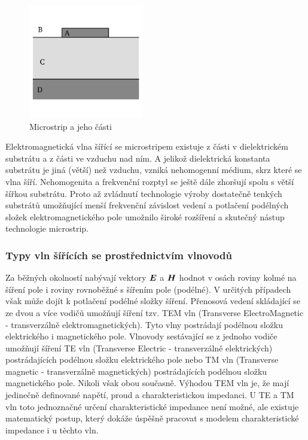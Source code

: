 \documentclass[12pt,a4paper,oneside]{article}
\numberwithin{equation}{section} %
\numberwithin{figure}{section} %
\numberwithin{table}{section} %
\renewcommand{\vec}[1]{\mbox{\boldmath$#1$}} %
\begin{document}
\begin{figure}[h] 
\begin{center}
\includegraphics[width=5cm]{microstrip.png}
\caption{Microstrip a jeho části}
\label{microstrip}
\end{center}
\end{figure}

Elektromagnetická vlna šířící se microstripem existuje z části v dielektrickém substrátu a z části ve vzduchu nad ním. A jelikož dielektrická konstanta substrátu je jiná (větší) než vzduchu, vzniká nehomogenní médium, skrz které se vlna šíří. Nehomogenita a frekvenční rozptyl se ještě dále zhoršují spolu s větší šířkou substrátu. Proto až zvládnutí technologie výroby dostatečně tenkých substrátů umožňující menší frekvenční závislost vedení a potlačení podélných složek elektromagnetického pole umožnilo široké rozšíření a skutečný nástup technologie microstrip. \cite{Microstrip}

\subsubsection{Typy vln šířících se prostřednictvím vlnovodů}
Za běžných okolností nabývají vektory $\vec{E}$ a $\vec{H}$ hodnot v osách roviny kolmé na šíření pole i roviny rovnoběžné s šířením pole (podélné). V určitých případech však může dojít k potlačení podélné složky šíření. Přenosová vedení skládající se ze dvou a více vodičů umožňují šíření tzv. TEM vln (Transverse ElectroMagnetic - transverzálně elektromagnetických). Tyto vlny postrádají podélnou složku elektrického i magnetického pole. Vlnovody sestávající se z jednoho vodiče umožňují šíření TE vln (Transverse Electric - transverzálně elektrických) postrádajících podélnou složku elektrického pole nebo TM vln (Transverse magnetic - transverzálně magnetických) postrádajících podélnou složku magnetického pole. Nikoli však obou současně. Výhodou TEM vln je, že mají jedinečně definované napětí, proud a charakteristickou impedanci. U TE a TM vln toto jednoznačné určení charakteristické impedance není možné, ale existuje matematický postup, který dokáže úspěšně pracovat s modelem charakteristické impedance i u těchto vln.
\end{document}

